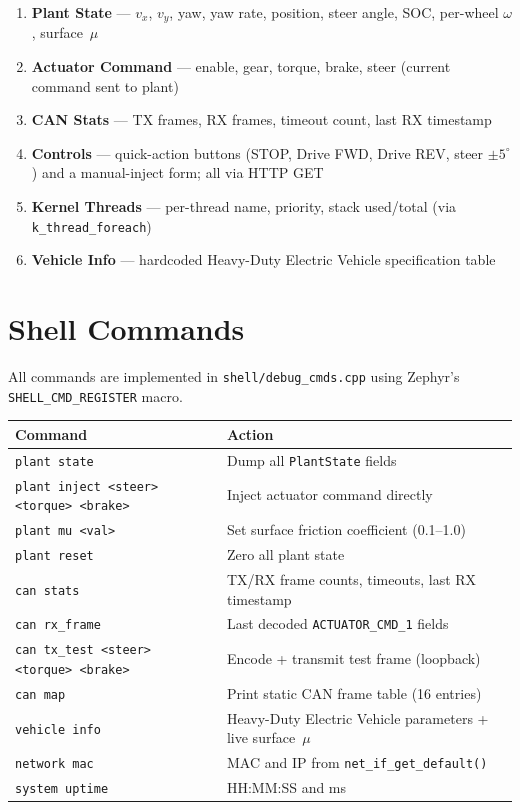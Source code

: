 \documentclass[11pt,a4paper]{article}
\begin{document}
\begin{enumerate}[leftmargin=*]
  \item \textbf{Plant State} — $v_x$, $v_y$, yaw, yaw rate, position, steer
        angle, SOC, per-wheel $\omega$, surface~$\mu$
  \item \textbf{Actuator Command} — enable, gear, torque, brake, steer (current
        command sent to plant)
  \item \textbf{CAN Stats} — TX frames, RX frames, timeout count, last RX
        timestamp
  \item \textbf{Controls} — quick-action buttons (STOP, Drive FWD, Drive REV,
        steer $\pm 5^\circ$) and a manual-inject form; all via HTTP GET
  \item \textbf{Kernel Threads} — per-thread name, priority, stack used/total
        (via \texttt{k\_thread\_foreach})
  \item \textbf{Vehicle Info} — hardcoded Heavy-Duty Electric Vehicle specification table
\end{enumerate}

\section{Shell Commands}

All commands are implemented in \texttt{shell/debug\_cmds.cpp} using Zephyr's
\texttt{SHELL\_CMD\_REGISTER} macro.

\begin{center}
\begin{tabular}{ll}
\toprule
Command & Action \\
\midrule
\texttt{plant state} & Dump all \texttt{PlantState} fields \\
\texttt{plant inject <steer> <torque> <brake>} & Inject actuator command directly \\
\texttt{plant mu <val>} & Set surface friction coefficient (0.1–1.0) \\
\texttt{plant reset} & Zero all plant state \\
\texttt{can stats} & TX/RX frame counts, timeouts, last RX timestamp \\
\texttt{can rx\_frame} & Last decoded \texttt{ACTUATOR\_CMD\_1} fields \\
\texttt{can tx\_test <steer> <torque> <brake>} & Encode + transmit test frame (loopback) \\
\texttt{can map} & Print static CAN frame table (16 entries) \\
\texttt{vehicle info} & Heavy-Duty Electric Vehicle parameters + live surface~$\mu$ \\
\texttt{network mac} & MAC and IP from \texttt{net\_if\_get\_default()} \\
\texttt{system uptime} & HH:MM:SS and ms \\
\bottomrule
\end{tabular}
\end{center}
\end{document}
